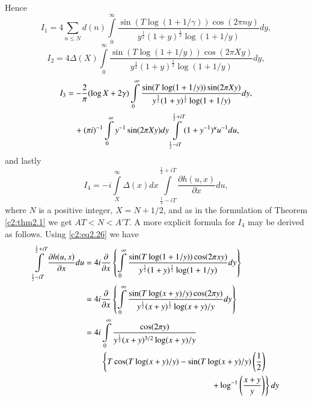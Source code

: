 Hence
\begin{equation}
  I_1 = 4 \sum_{n \leq N} d(n) \int\limits_0^\infty \frac{\sin (T \log
    (1+ 1/\gamma)) \cos (2 \pi n y)}{y^{\frac{1}{2}} (1+
    y)^{\frac{1}{2}} \log (1+ 1/y)} dy,\label{c2:eq2.31}
\end{equation}\pageoriginale
\begin{equation}
  I_2 = 4 \Delta  (X) \int\limits_0^\infty \frac{\sin (T \log (1+
    1/y))\cos (2 \pi Xy)}{y^{\frac{1}{2}}(1+ y)^{\frac{1}{2}} \log (1+
    1/y)}dy,\label{c2:eq2.32}
\end{equation}
\begin{align}
  I_3 & = - \frac{2}{\pi} (\log X + 2 \gamma)\int\limits_0^\infty
  \frac{\sin (T \log (1+ 
    1/y))\sin (2 \pi Xy)}{y^{\frac{3}{2}}(1+ y)^{\frac{1}{2}} \log (1+
    1/y)}dy,\notag\\
  & \quad + (\pi i)^{-1} \int\limits_0^\infty y^{-1} \sin (2 \pi Xy)
  dy \int\limits_{\frac{1}{2} - iT}^{\frac{1}{2} + iT} (1+ y^{-1})^{u}
  u^{-1} du,  \label{c2:eq2.33}
\end{align}
and lastly
\begin{equation}
  I_4 = -i \int\limits_X^\infty \Delta  (x) dx
  \int\limits_{\frac{1}{2} - iT}^{\frac{1}{2} + iT} \frac{\partial
    h(u, x)}{\partial x} du,\label{c2:eq2.34}
\end{equation}
where $N$ is a positive integer, $X = N + 1/2$, and as in the
formulation of Theorem \ref{c2:thm2.1} we get $AT < N < A'T$. A more
explicit formula for $I_4$ may be derived as follows. Using
\eqref{c2:eq2.26} we have
\begin{align*}
  \int\limits_{\frac{1}{2} - iT}^{\frac{1}{2} + iT} \frac{\partial
    h(u, x)}{\partial x} du &= 4 i \frac{\partial}{\partial x} \left\{
  \int\limits_0^\infty \frac{\sin ( T \log (1+ 1/y)) \cos (2 \pi
    xy)}{y^{\frac{1}{2}}(1+ y)^{\frac{1}{2}} \log (1+ 1/y)}dy
  \right\}\\
  &= 4i \frac{\partial}{\partial x} \left\{\int\limits_0^\infty
  \frac{\sin (T \log (x+y)/y)\cos (2 \pi y)}{y^{\frac{1}{2}}
    (x+y)^{\frac{1}{2}} \log (x+y)/y}dy \right\}\\
  &= 4i \int\limits_0^\infty \frac{\cos (2 \pi
    y)}{y^{\frac{1}{2}}(x+y)^{3/2} \log (x+ y)/y} \\
  &\qquad\left\{ T \cos (T \log (x+y)/y)- \sin (T \log
  (x+y)/y)\left(\frac{1}{2}\right)\right.\\ 
&\hspace{5.3cm}\left. + \log^{-1}\left(\frac{x+y}{y}
  \right)\right\} dy
\end{align*}

